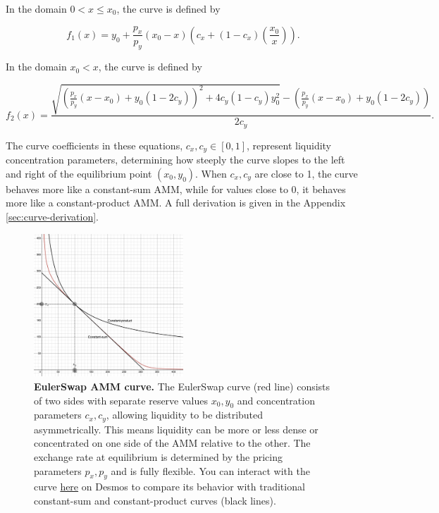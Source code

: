 \documentclass{article}
\begin{document}
In the domain $0 < x \leq x_0$, the curve is defined by

\begin{equation}
    \label{eq:fx1-main}
    f_1(x) 
    =
    y_{0}+\frac{p_{x}}{p_{y}}\left(x_{0}-x\right)\left(c_{x}+\left(1-c_{x}\right)\left(\frac{x_{0}}{x}\right)\right).
\end{equation}

In the domain $x_0 < x$, the curve is defined by

\begin{equation}
    \label{eq:fx2-main}
    f_2(x) 
    =
    \frac{
        \sqrt{
            \left( \frac{p_x}{p_y} (x - x_0) + y_0 (1 - 2c_y) \right)^2 
            + 4c_y (1 - c_y) y_0^2
        } 
        - \left( \frac{p_x}{p_y} (x - x_0) + y_0 (1 - 2c_y) \right)
    }{2c_y}.
\end{equation}

 The curve coefficients in these equations, \( c_x, c_y \in [0, 1] \), represent liquidity concentration parameters, determining how steeply the curve slopes to the left and right of the equilibrium point $(x_0, y_0)$. When \( c_x, c_y \) are close to 1, the curve behaves more like a constant-sum AMM, while for values close to 0, it behaves more like a constant-product AMM. A full derivation is given in the Appendix \ref{sec:curve-derivation}.  
 
 \begin{figure}[h]  %
    \centering  %
    \includegraphics[width=0.5\textwidth]{curve.png} %
    \caption{\textbf{EulerSwap AMM curve.} The EulerSwap curve (red line) consists of two sides with separate reserve values $x_0, y_0$ and concentration parameters $c_x, c_y$, allowing liquidity to be distributed asymmetrically. This means liquidity can be more or less dense or concentrated on one side of the AMM relative to the other. The exchange rate at equilibrium is determined by the pricing parameters $p_x, p_y$ and is fully flexible. You can interact with the curve \href{https://www.desmos.com/calculator/gzwmvbs1dk}{here} on Desmos to compare its behavior with traditional constant-sum and constant-product curves (black lines).}
    \label{fig:fig1}  %
\end{figure}
\end{document}
